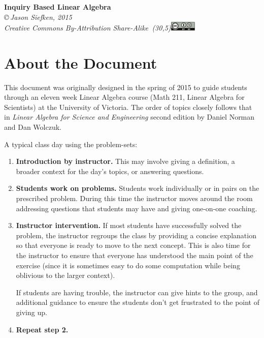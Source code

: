 \documentclass[letter]{article}
\begin{document}
\pagestyle{empty}

\begin{center}
{\huge\bf Inquiry Based Linear Algebra}\\

\vspace{.7in}
{
\it \copyright\,Jason Siefken, 2015 \\
Creative Commons By-Attribution Share-Alike\, \makebox(30,5){\includegraphics[height=1.2em]{by-sa.pdf}}
}
\end{center}

\section*{About the Document}
This document was originally designed in the spring of 2015 to guide students
through an eleven week Linear Algebra course (Math 211, Linear Algebra for Scientists) at
the University of Victoria.  The order of topics closely follows that in {\it Linear
Algebra for Science and Engineering} second edition by Daniel Norman and Dan Wolczuk.

A typical class day using the problem-sets:
\begin{enumerate}
	\item {\bf Introduction by instructor.} This may involve giving a definition,
		a broader context for the day's topics, or answering questions.
	\item {\bf Students work on problems.} Students work individually or in pairs
		on the prescribed problem.  During this time the instructor moves around
		the room addressing questions that students may have and giving one-on-one
		coaching.
	\item {\bf Instructor intervention.} If most students have successfully solved the 
		problem, the instructor regroups the class by providing a concise 
		explanation so that everyone is ready to move to the next concept.  This
		is also time for the instructor to ensure that everyone has understood the
		main point of the exercise (since it is sometimes easy to do some computation
		while being oblivious to the larger context).

		If students are having trouble, the instructor can give hints to the group,
		and additional guidance to ensure the students don't get frustrated
		to the point of giving up.
	\item {\bf Repeat step 2.}
\end{enumerate}
\end{document}
